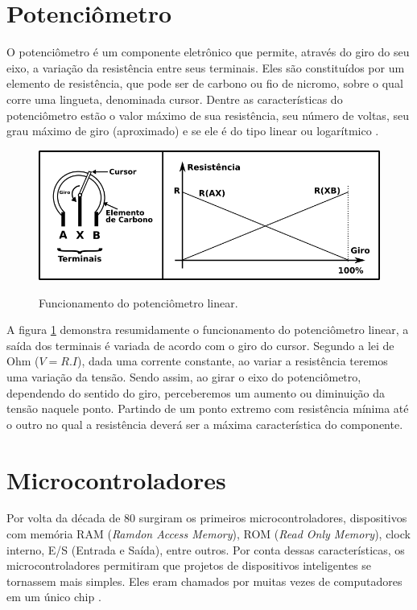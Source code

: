 \documentclass[
	12pt,				%
	openright,			%
	oneside,			%
	a4paper,			%
	english,			%
	brazil				%
	]{abntex2}
\begin{document}
		\section{Potenciômetro}
		O potenciômetro é um componente eletrônico que permite, através do giro do seu eixo, a variação da resistência entre seus terminais. Eles são constituídos por um elemento de resistência, que pode ser de carbono ou fio de nicromo, sobre o qual corre uma lingueta, denominada cursor. Dentre as características do potenciômetro estão o valor máximo de sua resistência, seu número de voltas, seu grau máximo de giro (aproximado) e se ele é do tipo linear ou logarítmico \cite{ncb2012eletronicabasica}.


		\begin{figure}[h!]
			\centering
  		\caption{Funcionamento do potenciômetro linear.}
  		\includegraphics[width=12cm]{./figures/potentiometer1.png}
  		\label{Fig:potentiometer1}
		\end{figure}

		A figura \ref{Fig:potentiometer1} demonstra resumidamente o funcionamento do potenciômetro linear, a saída dos terminais é variada de acordo com o giro do cursor. Segundo a lei de Ohm ($V = R.I$), dada uma corrente constante, ao variar a resistência teremos uma variação da tensão. Sendo assim, ao girar o eixo do potenciômetro, dependendo do sentido do giro, perceberemos um aumento ou diminuição da tensão naquele ponto. Partindo de um ponto extremo com resistência mínima até o outro no qual a resistência deverá ser a máxima característica do componente.


		\section{Microcontroladores}

		Por volta da década de 80 surgiram os primeiros microcontroladores, dispositivos com memória RAM (\textit{Ramdon Access Memory}), ROM (\textit{Read Only Memory}), clock interno, E/S (Entrada e Saída), entre outros. Por conta dessas características, os microcontroladores permitiram que projetos de dispositivos inteligentes se tornassem mais simples. Eles eram chamados por muitas vezes de computadores em um único chip \cite{pereiramicrocontroladores}. 
\end{document}
